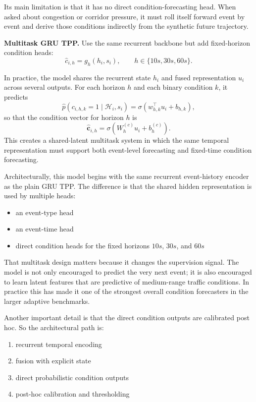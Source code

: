 \documentclass[11pt]{article}
\begin{document}
Its main limitation is that it has no direct condition-forecasting head. When asked about congestion or corridor pressure, it must roll itself forward event by event and derive those conditions indirectly from the synthetic future trajectory.

\textbf{Multitask GRU TPP.}
Use the same recurrent backbone but add fixed-horizon condition heads:
\[
\hat{c}_{i,h} = g_h(h_i, s_i), \qquad h \in \{10s, 30s, 60s\}.
\]

In practice, the model shares the recurrent state \(h_i\) and fused representation \(u_i\) across several outputs. For each horizon \(h\) and each binary condition \(k\), it predicts
\[
\hat{p}(c_{i,h,k}=1 \mid \mathcal{H}_i, s_i) =
\sigma(w_{h,k}^{\top} u_i + b_{h,k}),
\]
so that the condition vector for horizon \(h\) is
\[
\hat{\mathbf{c}}_{i,h} = \sigma(W_h^{(c)} u_i + b_h^{(c)}).
\]
This creates a shared-latent multitask system in which the same temporal representation must support both event-level forecasting and fixed-time condition forecasting.

Architecturally, this model begins with the same recurrent event-history encoder as the plain GRU TPP. The difference is that the shared hidden representation is used by multiple heads:
\begin{itemize}
  \item an event-type head
  \item an event-time head
  \item direct condition heads for the fixed horizons \(10s\), \(30s\), and \(60s\)
\end{itemize}

That multitask design matters because it changes the supervision signal. The model is not only encouraged to predict the very next event; it is also encouraged to learn latent features that are predictive of medium-range traffic conditions. In practice this has made it one of the strongest overall condition forecasters in the larger adaptive benchmarks.

Another important detail is that the direct condition outputs are calibrated post hoc. So the architectural path is:
\begin{enumerate}
  \item recurrent temporal encoding
  \item fusion with explicit state
  \item direct probabilistic condition outputs
  \item post-hoc calibration and thresholding
\end{enumerate}
\end{document}
